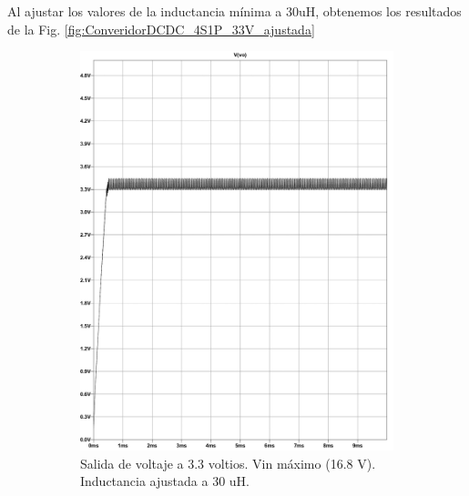 Al ajustar los valores de la inductancia mínima a 30uH, obtenemos los resultados de la Fig. \ref{fig:ConveridorDCDC_4S1P_33V_ajustada}


\begin{figure}[h]
  \centering
  \begin{subfigure}{0.48\linewidth}
    \includegraphics[width=\textwidth]{Pictures/Ajustada1_Max.jpg}
    \caption{Salida de voltaje a 3.3 voltios. Vin máximo (16.8 V). Inductancia ajustada a 30 uH.}
    \label{fig:4s1p_33v_2dcdcconverters_Max2}
  \end{subfigure}
  \hfill
  \begin{subfigure}{0.48\linewidth}

\end{subfigure}
\end{figure}
